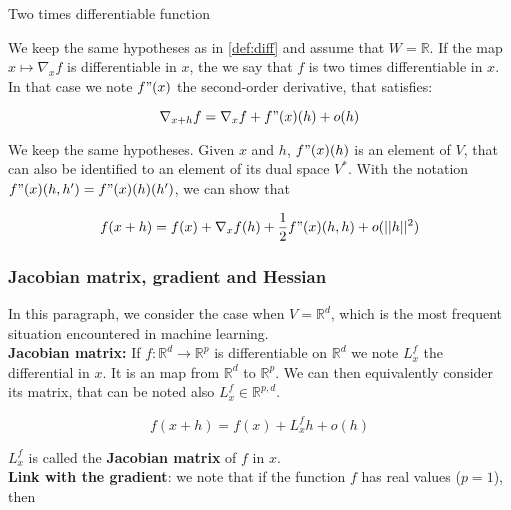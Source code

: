 \documentclass[
10pt, %
a4paper, %
oneside, %
headinclude,footinclude, %
BCOR5mm, %
]{scrartcl}
\begin{document}
\begin{definition}{Two times differentiable function}

    We keep the same hypotheses as in \ref{def:diff} and assume that $W= \mathbb{R}$. If the map $x\mapsto \nabla_xf $ is differentiable in $x$, the we say that $f$ is two times differentiable in $x$. In that case we note $f"(x)$ the second-order derivative, that satisfies:

    \begin{equation*}
	\nabla_{x+h}f=\nabla_xf+f"(x)(h)+o(h)
    \end{equation*}
\end{definition}

\begin{lemma}
    We keep the same hypotheses. Given $x$ and $h$, $f"(x)(h)$ is an element of $V$, that can also be identified to an element of its dual space $V^*$. With the notation $f"(x)(h, h')=f"(x)(h)(h')$, we can show that

    \begin{equation*}
	f(x+h)=f(x)+\nabla_xf(h)+ \frac{1}{2} f"(x)(h,h)+o(||h||^2)        
    \end{equation*}
\end{lemma}

\subsubsection{\large\color{Periwinkle}Jacobian matrix, gradient and Hessian}

In this paragraph, we consider the case when $V= \mathbb{R}^d$, which is the most frequent situation encountered in machine learning.
\\

\textbf{{Jacobian matrix:}} If $f: \mathbb{R}^d\rightarrow \mathbb{R}^p$ is differentiable on $ \mathbb{R}^d$ we note $L^f_x$ the differential in $x$. It is an map from $ \mathbb{R}^d$ to $ \mathbb{R}^p$. We can then equivalently consider its matrix, that can be noted also $L^f_x\in \mathbb{R}^{p, d}$. 

\begin{equation*}
    f(x+h)=f(x)+L^f_xh+o(h)
\end{equation*}

$L^f_x$ is called the \textbf{{Jacobian matrix}}  of $f$ in $x$.
\\

\textbf{{Link with the gradient}}: we note that if the function $f$ has real values ($p=1$), then 
\end{document}
